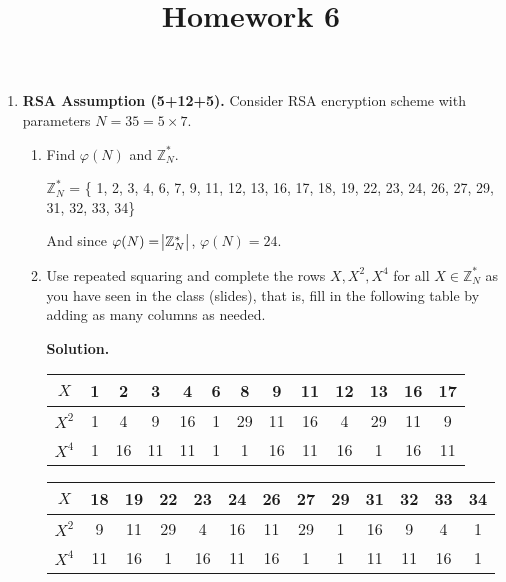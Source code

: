 \documentclass[11pt]{article}
\begin{document}
\title{Homework 6}

\date{}

\maketitle 

\thispagestyle{fancy}  
\pagestyle{fancy}      


\begin{enumerate}

\item {\bfseries RSA Assumption (5+12+5).} Consider RSA encryption scheme with parameters $N=35=5\times 7$.
\begin{enumerate}
    \item Find $\varphi(N)$ and $\mathbb{Z}^{*}_N$. 
    \newline

    $\mathbb{Z}^{*}_N$ = \{ 1, 2, 3, 4, 6, 7, 9, 11, 12, 13, 16, 17, 18, 19, 22, 23, 24, 26, 27, 29, 31, 32, 33, 34\} \newline

    And since $\varphi(N) = \abs{\mathbb{Z}^{*}_N}$, $\varphi(N) = 24$. \newline

    \vspace{0.3 \textheight}
    \item Use repeated squaring and complete the rows $X,X^2, X^4$ for all $X\in \mathbb{Z}^{*}_N$ as you have seen in the class (slides), that is, fill in the following table by adding as many columns as needed.

  {\bfseries Solution.}  \newline

   \begin{center}
       \begin{tabular}{|c|c|c|c|c|c|c|c|c|c|c|c|c|}
       \hline
        $X$ & 1 & 2  & 3  & 4  & 6 & 8  & 9  & 11 & 12 & 13 & 16 & 17 \\
       \hline
        $X^2$ & 1 & 4  & 9  & 16 & 1 & 29 & 11 & 16 & 4  & 29 & 11 & 9 \\
        \hline
        $X^4$ & 1 & 16 & 11 & 11 & 1 & 1  & 16 & 11 & 16 & 1  & 16 & 11 \\
       \hline
       \end{tabular}
    \end{center}

      \begin{center}
        \begin{tabular}{|c|c|c|c|c|c|c|c|c|c|c|c|c|}
        \hline
          $X$ & 18 & 19 & 22 & 23 & 24 & 26 & 27 & 29 & 31 & 32 & 33 & 34 \\
        \hline
          $X^2$ & 9  & 11 & 29 & 4  & 16 & 11 & 29 & 1  & 16 & 9  & 4  & 1 \\
        \hline
          $X^4$ & 11 & 16 & 1  & 16 & 11 & 16 & 1  & 1  & 11 & 11 & 16 & 1 \\
        \hline
      \end{tabular}
      \end{center}



\end{enumerate}
\end{enumerate}
\end{document}
